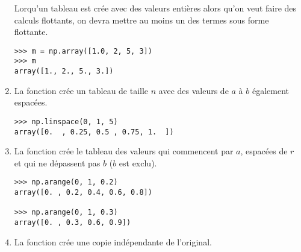 \begin{enumerate}
Lorqu'un tableau est crée avec des valeurs entières alors qu'on veut faire des calculs flottants, on devra mettre au moins un des termes sous forme flottante.
\begin{lstlisting}
>>> m = np.array([1.0, 2, 5, 3])
>>> m
array([1., 2., 5., 3.])
\end{lstlisting}

\item La fonction  crée un tableau de taille $n$ avec des valeurs de $a$ à $b$ également espacées.
\begin{lstlisting}
>>> np.linspace(0, 1, 5)
array([0.  , 0.25, 0.5 , 0.75, 1.  ])
\end{lstlisting}

\item La fonction  crée le tableau des valeurs qui commencent par $a$, espacées de $r$ et qui ne dépassent pas $b$ ($b$ est exclu).
\begin{lstlisting}
>>> np.arange(0, 1, 0.2)
array([0. , 0.2, 0.4, 0.6, 0.8])

>>> np.arange(0, 1, 0.3)
array([0. , 0.3, 0.6, 0.9])
\end{lstlisting}

\item La fonction  crée une copie indépendante de l'original.
\end{enumerate}

